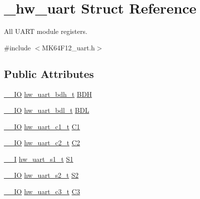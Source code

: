 \hypertarget{struct__hw__uart}{}\section{\+\_\+hw\+\_\+uart Struct Reference}
\label{struct__hw__uart}


All U\+A\+RT module registers.  




{\ttfamily \#include $<$M\+K64\+F12\+\_\+uart.\+h$>$}

\subsection*{Public Attributes}
\begin{DoxyCompactItemize}
\item 
\hyperlink{core__sc300_8h_aec43007d9998a0a0e01faede4133d6be}{\+\_\+\+\_\+\+IO} \hyperlink{union__hw__uart__bdh}{hw\+\_\+uart\+\_\+bdh\+\_\+t} \hyperlink{struct__hw__uart_a6b8f1f538980c351669830d1a94a8adc}{B\+DH}
\item 
\hyperlink{core__sc300_8h_aec43007d9998a0a0e01faede4133d6be}{\+\_\+\+\_\+\+IO} \hyperlink{union__hw__uart__bdl}{hw\+\_\+uart\+\_\+bdl\+\_\+t} \hyperlink{struct__hw__uart_a37ab6a62b7efb8ccc1cd6e281f80c0b9}{B\+DL}
\item 
\hyperlink{core__sc300_8h_aec43007d9998a0a0e01faede4133d6be}{\+\_\+\+\_\+\+IO} \hyperlink{union__hw__uart__c1}{hw\+\_\+uart\+\_\+c1\+\_\+t} \hyperlink{struct__hw__uart_a9bb2efd26bd629cc56abeec559cd9327}{C1}
\item 
\hyperlink{core__sc300_8h_aec43007d9998a0a0e01faede4133d6be}{\+\_\+\+\_\+\+IO} \hyperlink{union__hw__uart__c2}{hw\+\_\+uart\+\_\+c2\+\_\+t} \hyperlink{struct__hw__uart_a2eba8caa3f2d696bfe510c5c940e4158}{C2}
\item 
\hyperlink{core__sc300_8h_af63697ed9952cc71e1225efe205f6cd3}{\+\_\+\+\_\+I} \hyperlink{union__hw__uart__s1}{hw\+\_\+uart\+\_\+s1\+\_\+t} \hyperlink{struct__hw__uart_a30341939416e73c1f6ce7f17798af04b}{S1}
\item 
\hyperlink{core__sc300_8h_aec43007d9998a0a0e01faede4133d6be}{\+\_\+\+\_\+\+IO} \hyperlink{union__hw__uart__s2}{hw\+\_\+uart\+\_\+s2\+\_\+t} \hyperlink{struct__hw__uart_acfe0fe19ec0c86dfa6dee32b05d84a99}{S2}
\item 
\hyperlink{core__sc300_8h_aec43007d9998a0a0e01faede4133d6be}{\+\_\+\+\_\+\+IO} \hyperlink{union__hw__uart__c3}{hw\+\_\+uart\+\_\+c3\+\_\+t} \hyperlink{struct__hw__uart_a34917d1cbb907586ee907c259592227b}{C3}

\end{DoxyCompactItemize}

